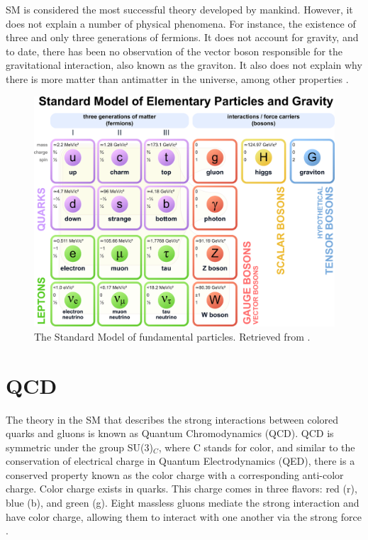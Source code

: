 SM is considered the most successful theory developed by mankind. However, it does not explain a number of physical phenomena. For instance, the existence of three and only three generations of fermions. It does not account for gravity, and to date, there has been no observation of the vector boson responsible for the gravitational interaction, also known as the graviton. It also does not explain why there is more matter than antimatter in the universe, among other properties \cite{grummer2021search, danilov2020measurement}.
\begin{figure}[htp!]
	\centering
	\includegraphics[scale=0.34]{MainContent/Figs/SM.eps}
	\caption{The Standard Model of fundamental particles. Retrieved from \cite{danilov2020measurement}.}
	\label{fig:sm}
\end{figure}

\section{QCD}
The theory in the SM that describes the strong interactions between colored quarks and gluons is known as Quantum Chromodynamics (QCD). QCD is symmetric under the group SU(3)$_C$, where C stands for color, and similar to the conservation of electrical charge in Quantum Electrodynamics (QED), there is a conserved property known as the color charge with a corresponding anti-color charge. Color charge exists in quarks. This charge comes in three flavors: red (r), blue (b), and green (g). Eight massless gluons mediate the strong interaction and have color charge, allowing them to interact with one another via the strong force \cite{di2020measurement, thomson2013modern, stiller2016full}.

